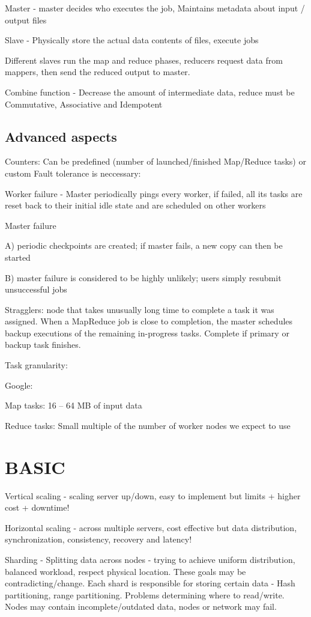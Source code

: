 Master - master decides who executes the job, Maintains metadata about input / output files

Slave - Physically store the actual data contents of files, execute jobs

Different slaves run the map and reduce phases, reducers request data from mappers, then send the reduced output to master.

Combine function - Decrease the amount of intermediate data, reduce must be Commutative, Associative and Idempotent

\subsection{Advanced aspects}
Counters: Can be predefined (number of launched/finished Map/Reduce tasks) or custom
Fault tolerance is neccessary:

Worker failure - Master periodically pings every worker, if failed, all its tasks are reset back to their initial idle state and are scheduled on other workers

Master failure

A) periodic checkpoints are created; if master fails, a new copy can then be started

B) master failure is considered to be highly unlikely; users simply resubmit unsuccessful jobs


Stragglers: node that takes unusually long time to complete a task it was assigned. When a MapReduce job is close to completion, the master schedules backup executions of the remaining in-progress tasks. Complete if primary or backup task finishes.

Task granularity: 

Google: 

Map tasks: 16 – 64 MB of input data

Reduce tasks: Small multiple of the number of worker nodes we expect to use

\section{BASIC}
Vertical scaling - scaling server up/down, easy to implement but limits + higher cost + downtime!

Horizontal scaling - across multiple servers, cost effective but data distribution, synchronization, consistency, recovery and latency!

Sharding - Splitting data across nodes - trying to achieve uniform distribution, balanced workload, respect physical location.
These goals may be contradicting/change. Each shard is responsible for storing certain data - Hash partitioning, range partitioning. Problems determining where to read/write. Nodes may contain incomplete/outdated data, nodes or network may fail.

